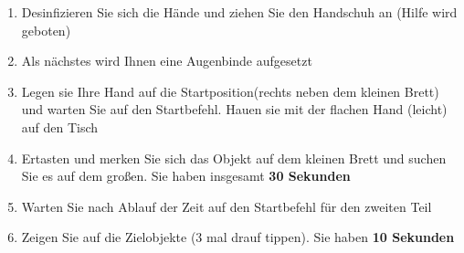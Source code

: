 \documentclass[paper=a4, fontsize=11pt]{scrartcl} %
\numberwithin{equation}{section} %
\numberwithin{figure}{section} %
\numberwithin{table}{section} %
\begin{document}
\begin{enumerate}
\item Desinfizieren Sie sich die Hände und ziehen Sie den Handschuh an (Hilfe wird geboten)
\item Als nächstes wird Ihnen eine Augenbinde aufgesetzt
\item Legen sie Ihre Hand auf die Startposition(rechts neben dem kleinen Brett) und warten Sie auf den Startbefehl. Hauen sie mit der flachen Hand (leicht) auf den Tisch
\item Ertasten und merken Sie sich das Objekt auf dem kleinen Brett und suchen Sie es auf dem großen. Sie haben insgesamt \textbf{30 Sekunden}
\item Warten Sie nach Ablauf der Zeit auf den Startbefehl für den zweiten Teil
\item Zeigen Sie auf die Zielobjekte (3 mal drauf tippen). Sie haben \textbf{10 Sekunden}
\end{enumerate}



\end{document}
